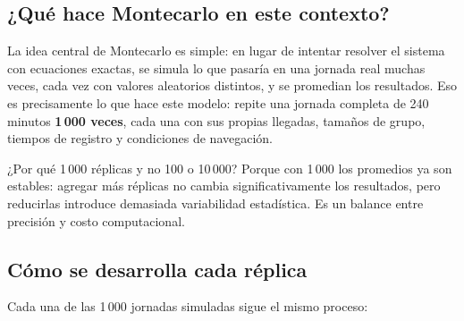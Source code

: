 \documentclass[12pt,a4paper]{article}
\begin{document}
\subsection{¿Qué hace Montecarlo en este contexto?}

La idea central de Montecarlo es simple: en lugar de intentar resolver
el sistema con ecuaciones exactas, se simula lo que pasaría en una
jornada real muchas veces, cada vez con valores aleatorios distintos, y
se promedian los resultados. Eso es precisamente lo que hace este modelo:
repite una jornada completa de 240 minutos \textbf{1\,000 veces}, cada
una con sus propias llegadas, tamaños de grupo, tiempos de registro y
condiciones de navegación.

¿Por qué 1\,000 réplicas y no 100 o 10\,000? Porque con 1\,000 los
promedios ya son estables: agregar más réplicas no cambia
significativamente los resultados, pero reducirlas introduce demasiada
variabilidad estadística. Es un balance entre precisión y costo
computacional.

\subsection{Cómo se desarrolla cada réplica}

Cada una de las 1\,000 jornadas simuladas sigue el mismo proceso:
\end{document}

